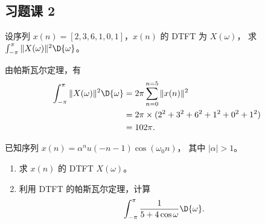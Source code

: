 \subsection{习题课 2}

\begin{exercise}
    设序列 $x(n) = [2, 3, 6, 1, 0, 1]$，$x(n)$ 的 DTFT 为 $X(\omega)$，
    求 $\int_{-\pi}^{\pi}\|X(\omega)\|^2\D{\omega}$。
\end{exercise}

\begin{solution}
    由帕斯瓦尔定理，有
    \begin{align*}
        \int_{-\pi}^{\pi}\|X(\omega)\|^2\D{\omega} & = 2\pi\sum_{n = 0}^{n = 5}\|x(n)\|^2 \\
        & = 2\pi \times (2^2 + 3^2 + 6^2 + 1^2 + 0^2 + 1^2) \\
        & = 102\pi.
    \end{align*}
\end{solution}

\begin{exercise}
    已知序列 $x(n) = \alpha^n u(-n-1)\cos(\omega_0 n)$，
    其中 $|\alpha| > 1$。
    \begin{enumerate}[label=(\arabic*)]
        \item 求 $x(n)$ 的 DTFT $X(\omega)$。
        \item 利用 DTFT 的帕斯瓦尔定理，计算
            \begin{align*}
                \int_{-\pi}^{\pi}\frac{1}{5 + 4\cos \omega}\D{\omega}.
            \end{align*}
    \end{enumerate}
\end{exercise}

